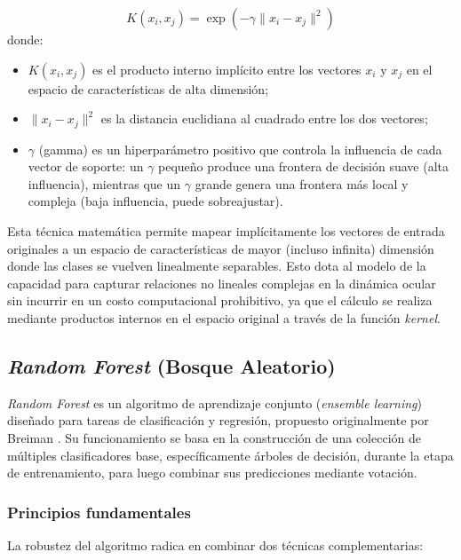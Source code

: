\begin{equation}
	K(x_i, x_j) = \exp\left(-\gamma \|x_i - x_j\|^2\right) \tag{15}
\end{equation}
donde:
\begin{itemize}
	\item $K(x_i, x_j)$ es el producto interno implícito entre los vectores $x_i$ y $x_j$ en el espacio de características de alta dimensión;
	\item $\|x_i - x_j\|^2$ es la distancia euclidiana al cuadrado entre los dos vectores;
	\item $\gamma$ (gamma) es un hiperparámetro positivo que controla la influencia de cada vector de soporte: un $\gamma$ pequeño produce una frontera de decisión suave (alta influencia), mientras que un $\gamma$ grande genera una frontera más local y compleja (baja influencia, puede sobreajustar).
\end{itemize}

Esta técnica matemática permite mapear implícitamente los vectores de entrada originales a un espacio de características de mayor (incluso infinita) dimensión donde las clases se vuelven linealmente separables. Esto dota al modelo de la capacidad para capturar relaciones no lineales complejas en la dinámica ocular sin incurrir en un costo computacional prohibitivo, ya que el cálculo se realiza mediante productos internos en el espacio original a través de la función \textit{kernel}.

\subsection{\textit{Random Forest} (Bosque Aleatorio)}
\label{subsec:random_forest}

\textit{Random Forest} es un algoritmo de aprendizaje conjunto (\textit{ensemble learning}) diseñado para tareas de clasificación y regresión, propuesto originalmente por Breiman \cite{breiman2001}. Su funcionamiento se basa en la construcción de una colección de múltiples clasificadores base, específicamente árboles de decisión, durante la etapa de entrenamiento, para luego combinar sus predicciones mediante votación.

\subsubsection{Principios fundamentales}

La robustez del algoritmo radica en combinar dos técnicas complementarias:

